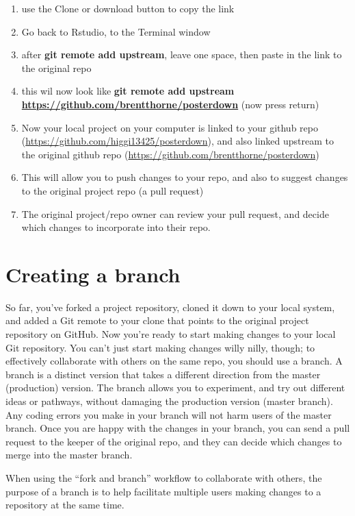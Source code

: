 \documentclass[
]{book}
\providecommand{\tightlist}{%
  \setlength{\itemsep}{0pt}\setlength{\parskip}{0pt}}
\begin{document}
\begin{enumerate}
\def\labelenumi{\arabic{enumi}.}
\setcounter{enumi}{4}
\tightlist
\item
  use the Clone or download button to copy the link
\item
  Go back to Rstudio, to the Terminal window
\item
  after \textbf{git remote add upstream}, leave one space, then paste in the link to the original repo
\item
  this wil now look like \textbf{git remote add upstream \url{https://github.com/brentthorne/posterdown}} (now press return)
\item
  Now your local project on your computer is linked to your github repo (\url{https://github.com/higgi13425/posterdown}), and also linked upstream to the original github repo (\url{https://github.com/brentthorne/posterdown})
\item
  This will allow you to push changes to your repo, and also to suggest changes to the original project repo (a pull request)
\item
  The original project/repo owner can review your pull request, and decide which changes to incorporate into their repo.
\end{enumerate}

\hypertarget{creating-a-branch}{%
\section{Creating a branch}\label{creating-a-branch}}

So far, you've forked a project repository, cloned it down to your local system, and added a Git remote to your clone that points to the original project repository on GitHub. Now you're ready to start making changes to your local Git repository. You can't just start making changes willy nilly, though; to effectively collaborate with others on the same repo, you should use a branch.
A branch is a distinct version that takes a different direction from the master (production) version. The branch allows you to experiment, and try out different ideas or pathways, without damaging the production version (master branch). Any coding errors you make in your branch will not harm users of the master branch. Once you are happy with the changes in your branch, you can send a pull request to the keeper of the original repo, and they can decide which changes to merge into the master branch.

When using the ``fork and branch'' workflow to collaborate with others, the purpose of a branch is to help facilitate multiple users making changes to a repository at the same time.
\end{document}
